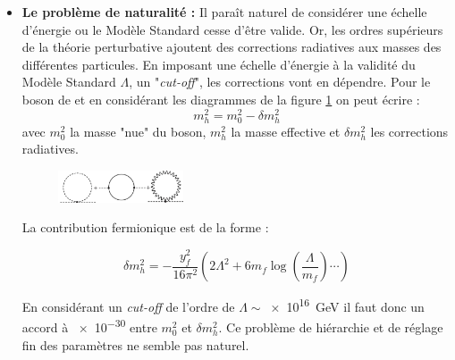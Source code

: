 \begin{itemize}[label=$\bullet$]
\item \textbf{Le problème de naturalité :} Il paraît naturel de considérer une échelle d'énergie ou le Modèle Standard cesse d'être valide. Or, les ordres supérieurs de la théorie perturbative ajoutent des corrections radiatives aux masses des différentes particules. En imposant une échelle d'énergie à la validité du Modèle Standard $\Lambda$, un "\textit{cut-off}", les corrections vont en dépendre. Pour le boson de  et en considérant les diagrammes de la figure \ref{corrections} on peut écrire :
\begin{equation}
m_{h}^{2}=m_{0}^{2}-\delta m_{h}^{2}
\end{equation}
avec $m_{0}^{2}$ la masse "nue" du boson, $m_{h}^{2}$ la masse effective et $\delta m_{h}^{2}$ les corrections radiatives.

\begin{figure}[ht!]
\centering
\includegraphics[width=0.35\textwidth]{SM/corrections.jpg}
\label{corrections}
\end{figure}

La contribution fermionique est de la forme :

\begin{equation}
\label{eq1}
\delta m_{h}^{2}=-\frac{y_{f}^{2}}{16\pi^{2}}\left(2\Lambda^{2}+6m_{f}\log\left(\frac{\Lambda}{m_{f}}\right)\cdots\right)
\end{equation}

En considérant un \textit{cut-off} de l'ordre de $\Lambda \sim$\SI{e16}{\giga\eV} il faut donc un accord à \num{e-30} entre $m_{0}^{2}$ et $\delta m_{h}^{2}$. Ce problème de hiérarchie et de réglage fin des paramètres ne semble pas naturel.


\end{itemize}
